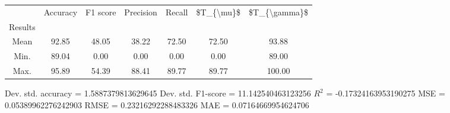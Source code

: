 \begin{tabular}{|c|c|c|c|c|c|c|}
\toprule
{} &  Accuracy &  F1 score &  Precision &  Recall &  \$T\_\{\textbackslash mu\}\$ &  \$T\_\{\textbackslash gamma\}\$ \\
Results &           &           &            &         &            &               \\
\hline
Mean    &     92.85 &     48.05 &      38.22 &   72.50 &      72.50 &         93.88 \\
Min.    &     89.04 &      0.00 &       0.00 &    0.00 &       0.00 &         89.00 \\
Max.    &     95.89 &     54.39 &      88.41 &   89.77 &      89.77 &        100.00 \\
\bottomrule
\end{tabular}

 Dev. std. accuracy = 1.5887379813629645
 Dev. std. F1-score = 11.142540463123256
 $R^2$ = -0.17324163953190275
 MSE = 0.05389962276242903
 RMSE = 0.23216292288483326
 MAE = 0.07164669954624706